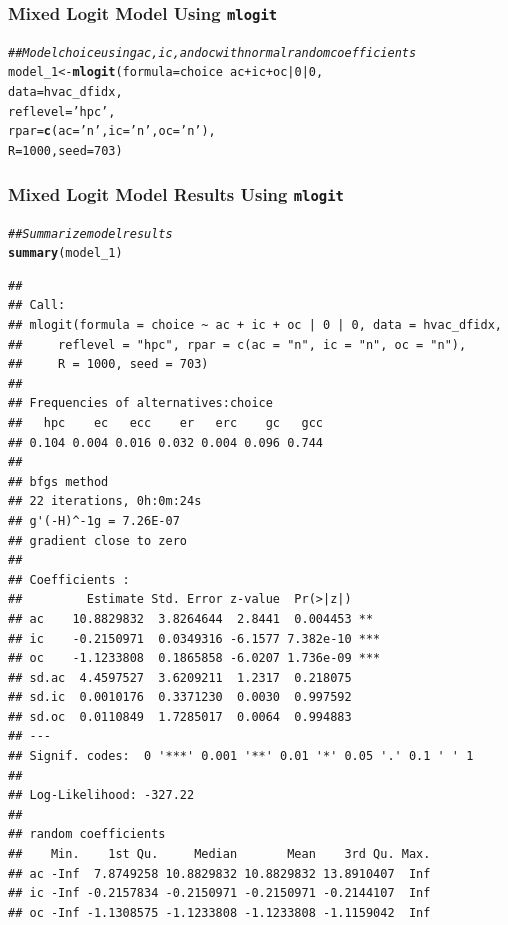 \documentclass{beamer}\usepackage[]{graphicx}\usepackage[]{xcolor}
\makeatletter
\newcommand{\hlnum}[1]{\textcolor[rgb]{0.686,0.059,0.569}{#1}}%
\newcommand{\hlstr}[1]{\textcolor[rgb]{0.192,0.494,0.8}{#1}}%
\newcommand{\hlcom}[1]{\textcolor[rgb]{0.678,0.584,0.686}{\textit{#1}}}%
\newcommand{\hlopt}[1]{\textcolor[rgb]{0,0,0}{#1}}%
\newcommand{\hlstd}[1]{\textcolor[rgb]{0.345,0.345,0.345}{#1}}%
\newcommand{\hlkwb}[1]{\textcolor[rgb]{0.69,0.353,0.396}{#1}}%
\newcommand{\hlkwc}[1]{\textcolor[rgb]{0.333,0.667,0.333}{#1}}%
\newcommand{\hlkwd}[1]{\textcolor[rgb]{0.737,0.353,0.396}{\textbf{#1}}}%
\newenvironment{kframe}{%
 \def\at@end@of@kframe{}%
 \ifinner\ifhmode%
  \def\at@end@of@kframe{\end{minipage}}%
  \begin{minipage}{\columnwidth}%
 \fi\fi%
 \def\FrameCommand##1{\hskip\@totalleftmargin \hskip-\fboxsep
 \colorbox{shadecolor}{##1}\hskip-\fboxsep
     \hskip-\linewidth \hskip-\@totalleftmargin \hskip\columnwidth}%
 \MakeFramed {\advance\hsize-\width
   \@totalleftmargin\z@ \linewidth\hsize
   \@setminipage}}%
 {\par\unskip\endMakeFramed%
 \at@end@of@kframe}
\newenvironment{knitrout}{}{} %
\makeatother
\begin{document}
\begin{frame}[fragile]\frametitle{Mixed Logit Model Using \texttt{mlogit}}
\begin{knitrout}\footnotesize
{}\color{fgcolor}\begin{kframe}
\begin{alltt}
\hlcom{## Model choice using ac, ic, and oc with normal random coefficients}
\hlstd{model_1} \hlkwb{<-} \hlkwd{mlogit}\hlstd{(}\hlkwc{formula} \hlstd{= choice} \hlopt{~} \hlstd{ac} \hlopt{+} \hlstd{ic} \hlopt{+} \hlstd{oc} \hlopt{|} \hlnum{0} \hlopt{|} \hlnum{0}\hlstd{,}
                  \hlkwc{data} \hlstd{= hvac_dfidx,}
                  \hlkwc{reflevel} \hlstd{=} \hlstr{'hpc'}\hlstd{,}
                  \hlkwc{rpar} \hlstd{=} \hlkwd{c}\hlstd{(}\hlkwc{ac} \hlstd{=} \hlstr{'n'}\hlstd{,} \hlkwc{ic} \hlstd{=} \hlstr{'n'}\hlstd{,} \hlkwc{oc} \hlstd{=} \hlstr{'n'}\hlstd{),}
                  \hlkwc{R} \hlstd{=} \hlnum{1000}\hlstd{,} \hlkwc{seed} \hlstd{=} \hlnum{703}\hlstd{)}
\end{alltt}
\end{kframe}
\end{knitrout}
\end{frame}

\begin{frame}[fragile]\frametitle{Mixed Logit Model Results Using \texttt{mlogit}}
    \vspace{1ex}
\begin{knitrout}\tiny
{}\color{fgcolor}\begin{kframe}
\begin{alltt}
\hlcom{## Summarize model results}
\hlkwd{summary}\hlstd{(model_1)}
\end{alltt}
\begin{verbatim}
## 
## Call:
## mlogit(formula = choice ~ ac + ic + oc | 0 | 0, data = hvac_dfidx, 
##     reflevel = "hpc", rpar = c(ac = "n", ic = "n", oc = "n"), 
##     R = 1000, seed = 703)
## 
## Frequencies of alternatives:choice
##   hpc    ec   ecc    er   erc    gc   gcc 
## 0.104 0.004 0.016 0.032 0.004 0.096 0.744 
## 
## bfgs method
## 22 iterations, 0h:0m:24s 
## g'(-H)^-1g = 7.26E-07 
## gradient close to zero 
## 
## Coefficients :
##         Estimate Std. Error z-value  Pr(>|z|)    
## ac    10.8829832  3.8264644  2.8441  0.004453 ** 
## ic    -0.2150971  0.0349316 -6.1577 7.382e-10 ***
## oc    -1.1233808  0.1865858 -6.0207 1.736e-09 ***
## sd.ac  4.4597527  3.6209211  1.2317  0.218075    
## sd.ic  0.0010176  0.3371230  0.0030  0.997592    
## sd.oc  0.0110849  1.7285017  0.0064  0.994883    
## ---
## Signif. codes:  0 '***' 0.001 '**' 0.01 '*' 0.05 '.' 0.1 ' ' 1
## 
## Log-Likelihood: -327.22
## 
## random coefficients
##    Min.    1st Qu.     Median       Mean    3rd Qu. Max.
## ac -Inf  7.8749258 10.8829832 10.8829832 13.8910407  Inf
## ic -Inf -0.2157834 -0.2150971 -0.2150971 -0.2144107  Inf
## oc -Inf -1.1308575 -1.1233808 -1.1233808 -1.1159042  Inf
\end{verbatim}
\end{kframe}
\end{knitrout}
\end{frame}
\end{document}
